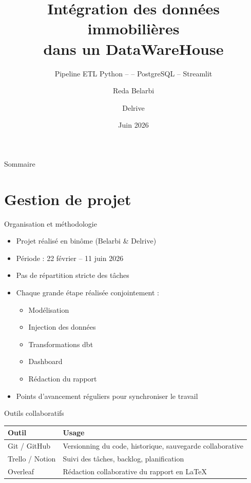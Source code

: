 \documentclass[12pt,aspectratio=169]{beamer}
\title[Pipeline DVF]{Intégration des données immobilières\\dans un DataWareHouse}
\subtitle{Pipeline ETL Python -- \dbt{} -- PostgreSQL -- Streamlit}
\author{Reda Belarbi \and Delrive}
\institute{IUT -- Université de Lille}
\date{Juin 2026}
\newcommand{\dbt}{dbt}
\begin{document}
\begin{frame}
  \titlepage
\end{frame}

\begin{frame}{Sommaire}
  \hypertarget{sommaire}{}
  \tableofcontents
\end{frame}


\section{Gestion de projet}

\begin{frame}{Organisation et méthodologie}
  \begin{itemize}
    \item<+-> Projet réalisé en \alert{binôme} (Belarbi \& Delrive)
    \item<+-> Période : \alert{22 février -- 11 juin 2026}
    \item<+-> Pas de répartition stricte des tâches
    \item<+-> Chaque grande étape réalisée conjointement :
    \begin{itemize}
      \item Modélisation
      \item Injection des données
      \item Transformations \dbt{}
      \item Dashboard
      \item Rédaction du rapport
    \end{itemize}
    \item<+-> Points d'avancement réguliers pour synchroniser le travail
  \end{itemize}
\end{frame}

\begin{frame}{Outils collaboratifs}
  \begin{table}
    \centering
    \begin{tabularx}{\linewidth}{lX}
      \toprule
      \textbf{Outil} & \textbf{Usage} \\
      \midrule
      Git / GitHub    & Versionning du code, historique, sauvegarde collaborative \\
      Trello / Notion & Suivi des tâches, backlog, planification \\
      Overleaf        & Rédaction collaborative du rapport en \LaTeX{} \\
      \bottomrule
    \end{tabularx}
  \end{table}
\end{frame}
\end{document}
